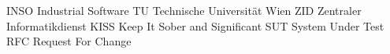 	{INSO}	{Industrial Software}
	{TU}	{Technische Universit\"at Wien}
	{ZID}	{Zentraler Informatikdienst}
	{KISS}	{Keep It Sober and Significant}
	{SUT}	{System Under Test}
	{RFC}	{Request For Change}

